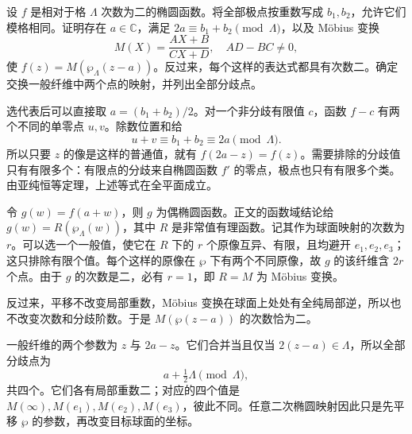 \begin{exercise}[次数二的全部椭圆函数]\label{b3:ex:22-2}
设 \(f\) 是相对于格 \(\Lambda\) 次数为二的椭圆函数。将全部极点按重数写成 \(b_1,b_2\)，允许它们模格相同。证明存在 \(a\in\mathbb C\)，满足 \(2a\equiv b_1+b_2\pmod\Lambda\)，以及 Möbius 变换
\[
 M(X)=\frac{AX+B}{CX+D},\quad AD-BC\ne0,
\]
使 \(f(z)=M(\wp_\Lambda(z-a))\)。反过来，每个这样的表达式都具有次数二。确定交换一般纤维中两个点的映射，并列出全部分歧点。
\end{exercise}
\begin{solution}
选代表后可以直接取 \(a=(b_1+b_2)/2\)。对一个非分歧有限值 \(c\)，函数 \(f-c\) 有两个不同的单零点 \(u,v\)。除数位置和给
\[
 u+v\equiv b_1+b_2\equiv2a\pmod\Lambda.
\]
所以只要 \(z\) 的像是这样的普通值，就有 \(f(2a-z)=f(z)\)。需要排除的分歧值只有有限多个：有限点的分歧来自椭圆函数 \(f'\) 的零点，极点也只有有限多个类。由亚纯恒等定理，上述等式在全平面成立。

令 \(g(w)=f(a+w)\)，则 \(g\) 为偶椭圆函数。正文的函数域结论给 \(g(w)=R(\wp_\Lambda(w))\)，其中 \(R\) 是非常值有理函数。记其作为球面映射的次数为 \(r\)。可以选一个一般值，使它在 \(R\) 下的 \(r\) 个原像互异、有限，且均避开 \(e_1,e_2,e_3\)；这只排除有限个值。每个这样的原像在 \(\wp\) 下有两个不同原像，故 \(g\) 的该纤维含 \(2r\) 个点。由于 \(g\) 的次数是二，必有 \(r=1\)，即 \(R=M\) 为 Möbius 变换。

反过来，平移不改变局部重数，Möbius 变换在球面上处处有全纯局部逆，所以也不改变次数和分歧阶数。于是 \(M(\wp(z-a))\) 的次数恰为二。

一般纤维的两个参数为 \(z\) 与 \(2a-z\)。它们合并当且仅当
\(2(z-a)\in\Lambda\)，所以全部分歧点为
\[
 a+\tfrac12\Lambda\pmod\Lambda,
\]
共四个。它们各有局部重数二；对应的四个值是 \(M(\infty),M(e_1),M(e_2),M(e_3)\)，彼此不同。任意二次椭圆映射因此只是先平移 \(\wp\) 的参数，再改变目标球面的坐标。
\end{solution}

